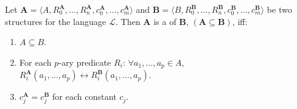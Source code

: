Let $\mathbf{A} = \langle A, R_0^{\mathbf{A}}, \ldots, R_n^{\mathbf{A}}, c_0^{\mathbf{A}}, \ldots, c_m^{\mathbf{A}} \rangle$ and $\mathbf{B} = \langle B, R_0^{\mathbf{B}}, \ldots, R_n^{\mathbf{B}}, c_0^{\mathbf{B}}, \ldots, c_m^{\mathbf{B}} \rangle$ be two structures for the language $\mathcal{L}$. Then $\mathbf{A}$ is a  of $\mathbf{B}$, $(\mathbf{A} \subseteq \mathbf{B})$, iff:
\begin{enumerate}
\item $A \subseteq B$.
\item For each $p$-ary predicate $R_i$: $\forall a_1, \ldots, a_p \in A$, $R_i^{\mathbf{A}}(a_1, \ldots, a_p) \leftrightarrow R_i^{\mathbf{B}}(a_1, \ldots, a_p)$.
\item $c_j^{\mathbf{A}} = c_j^{\mathbf{B}}$ for each constant $c_j$.
\end{enumerate}
